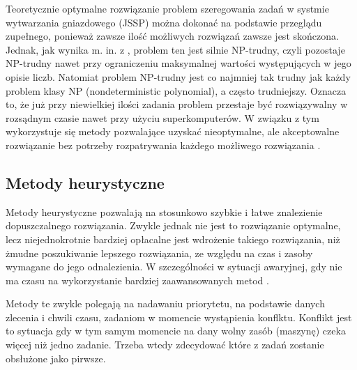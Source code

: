 \documentclass[twoside]{kInzynierka}
\begin{document}
Teoretycznie optymalne rozwiązanie problem szeregowania zadań w systmie wytwarzania gniazdowego (JSSP) można dokonać na podstawie przeglądu zupełnego, ponieważ zawsze ilość możliwych rozwiązań zawsze jest skończona. Jednak, jak wynika m. in. z \cite{np1}\cite{np2}, problem ten jest silnie NP-trudny, czyli pozostaje NP-trudny nawet przy ograniczeniu maksymalnej wartości występujących w jego opisie liczb. Natomiat problem NP-trudny jest co najmniej tak trudny jak każdy problem klasy NP (nondeterministic polynomial), a często trudniejszy. Oznacza to, że już przy niewielkiej ilości zadania problem przestaje być rozwiązywalny w rozsądnym czasie nawet przy użyciu superkomputerów. W związku z tym wykorzystuje się metody pozwalające uzyskać nieoptymalne, ale akceptowalne rozwiązanie bez potrzeby rozpatrywania każdego możliwego rozwiązania \cite{np}.

\subsection     {Metody heurystyczne}
Metody heurystyczne pozwalają na stosunkowo szybkie i łatwe znalezienie dopuszczalnego rozwiązania. Zwykle jednak nie jest to rozwiązanie optymalne, lecz niejednokrotnie bardziej opłacalne jest wdrożenie takiego rozwiązania, niż żmudne poszukiwanie lepszego rozwiązania, ze względu na czas i zasoby wymagane do jego odnalezienia. W szczególności w sytuacji awaryjnej, gdy nie ma czasu na wykorzystanie bardziej zaawansowanych metod \cite{dynamic}. 

Metody te zwykle polegają na nadawaniu priorytetu, na podstawie danych zlecenia i chwili czasu, zadaniom w momencie wystąpienia konflktu. Konflikt jest to sytuacja gdy w tym samym momencie na dany wolny zasób (maszynę) czeka więcej niż jedno zadanie. Trzeba wtedy zdecydować które z zadań zostanie obsłużone jako pirwsze. 
\end{document}
